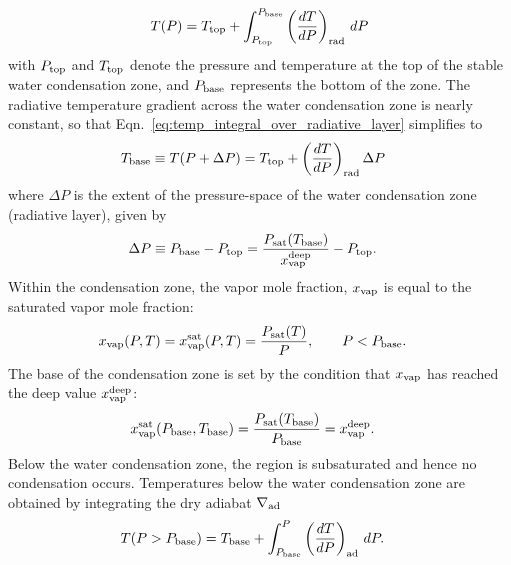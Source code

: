 \documentclass[11pt]{ucscthesisbs}
\begin{document}
\begin{equation}
  T(P) = T_{\rm top} + \int_{P_{\rm top}}^{P_{\rm base}} \left(\frac{dT}{dP}\right)_{\rm rad}\,d P
  \label{eq:temp_integral_over_radiative_layer}
\end{equation}
with $P_{\rm top}$ and $T_{\rm top}$ denote the pressure and temperature at the top of the stable water condensation zone, and $P_{\rm base}$ represents the bottom of the zone. The radiative temperature gradient across the water condensation zone is nearly constant, so that Eqn.~\ref{eq:temp_integral_over_radiative_layer} simplifies to
\begin{align}
T_{\rm base}\equiv T(P+\Delta P) &= T_{\rm top} + \left(\frac{dT}{dP}\right)_{\rm rad}\Delta P
\label{eq:temperature_profile_over_radiative_layer_simplification}
\end{align}
where $\Delta P$ is the extent of the pressure-space of the water condensation zone (radiative layer), given by
\begin{align}
\Delta P \equiv P_{\rm base}-P_{\rm top} &= \frac{P_{\rm sat}(T_{\rm base})}{x_{\rm vap}^{\rm deep}} - P_{\rm top}.
\label{eq:delta_P_over_radiative_layer}
\end{align}
Within the condensation zone, the vapor mole fraction, $x_{\rm vap}$ is equal to the saturated vapor mole fraction:
\begin{align}
x_{\rm vap}(P, T) &= x_{\rm vap}^{\rm sat}(P, T) = \frac{P_{\rm sat}(T)}{P}, \qquad P<P_{\rm base}.
\label{eq:vapor_mole_fraction_within_condensation_zone}
\end{align}
The base of the condensation zone is set by the condition that $x_{\rm vap}$ has reached the deep value $x_{\rm vap}^{\rm deep}$:
\begin{align}
x_{\rm vap}^{\rm sat}(P_{\rm base}, T_{\rm base}) &= \frac{P_{\rm sat}(T_{\rm base})}{P_{\rm base}}=x_{\rm vap}^{\rm deep}.
\end{align}
Below the water condensation zone, the region is subsaturated and hence no condensation occurs. Temperatures below the water condensation zone are obtained by integrating the dry adiabat $\nabla_{\rm ad}$
\begin{align}
T(P>P_{\rm base}) &= T_{\rm base} + \int_{P_{\rm base}}^P\left(\frac{dT}{dP}\right)_{\rm ad}\,d P.
\label{eq:dry_adiabat_integration}
\end{align}
\end{document}
